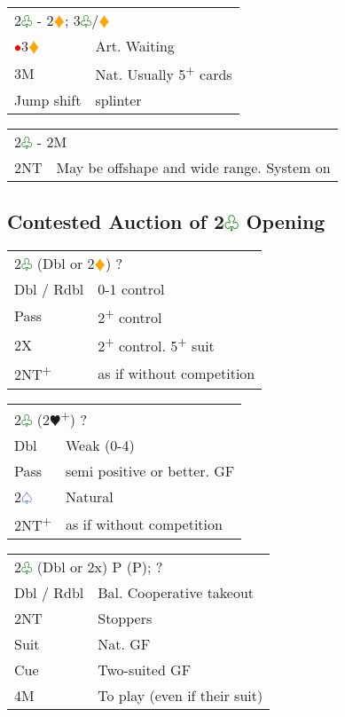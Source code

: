 \documentclass{article}
\renewcommand{\sp}{\textcolor{RoyalBlue}{$\varspade$}}
\newcommand{\he}{\textcolor{RubineRed}{$\varheart$}}
\newcommand{\di}{\textcolor{Orange}{$\vardiamond$}}
\newcommand{\cl}{\textcolor{Green}{$\varclub$}}
\newcommand{\nt}{\relsize{-1}NT\relsize{1}}
\newcommand{\up}{\textsuperscript{+}}
\newcommand{\al}{\textcolor{red}{$\bullet$}}
\begin{document}
\medskip

\begin{tabular}{|l|p{6.5cm}}
	\multicolumn{2}{l}{2\cl{} - 2\di{}; 3\cl{}/\di{}}\\
	\al{}3\di{} & Art. Waiting \\
	3M & Nat. Usually 5\up{} cards \\
	Jump shift & splinter \\
\end{tabular}

\medskip

\begin{tabular}{|l|p{6.5cm}}
	\multicolumn{2}{l}{2\cl{} - 2M}\\
	2\nt{} & May be offshape and wide range. System on \\
\end{tabular}


\subsection{Contested Auction of 2\cl{} Opening}

\begin{tabular}{|l|p{6.5cm}}
	\multicolumn{2}{l}{2\cl{} (Dbl or 2\di{}) ?}\\
	Dbl / Rdbl & 0-1 control \\
	Pass & 2\up{} control \\
	2X & 2\up{} control. 5\up{} suit \\
	2\nt{}\up{} & as if without competition \\
\end{tabular}

\medskip

\begin{tabular}{|l|p{6.5cm}}
	\multicolumn{2}{l}{2\cl{} (2\he{}\up{}) ?}\\
	Dbl & Weak (0-4) \\
	Pass & semi positive or better. GF \\
	2\sp{} & Natural \\
	2\nt{}\up{} & as if without competition \\
\end{tabular}

\medskip

\begin{tabular}{|l|p{6.5cm}}
	\multicolumn{2}{l}{2\cl{} (Dbl or 2x) P (P); ?}\\
	Dbl / Rdbl & Bal. Cooperative takeout \\
	2\nt{} & Stoppers \\
	Suit & Nat. GF \\
	Cue & Two-suited GF \\
	4M & To play (even if their suit) \\
\end{tabular}
\end{document}

